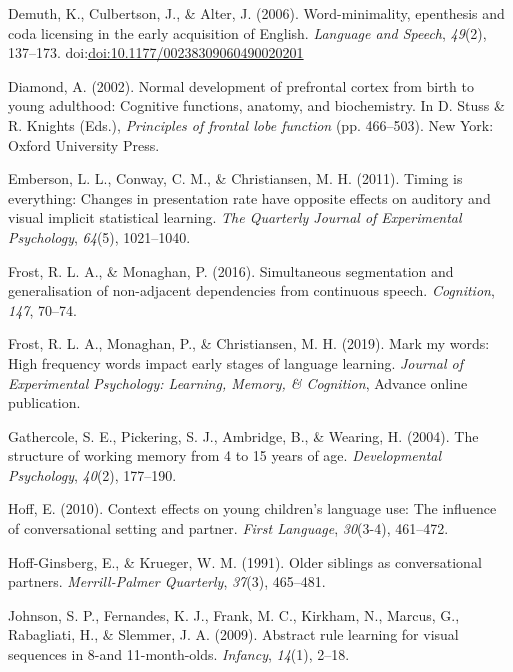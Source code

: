 \documentclass[man,mask,floatsintext]{apa6}
\begin{document}
\hypertarget{ref-demuth2006word}{}
Demuth, K., Culbertson, J., \& Alter, J. (2006). Word-minimality,
epenthesis and coda licensing in the early acquisition of English.
\emph{Language and Speech}, \emph{49}(2), 137--173.
doi:\href{https://doi.org/doi:10.1177/00238309060490020201}{doi:10.1177/00238309060490020201}

\hypertarget{ref-diamond2002normal}{}
Diamond, A. (2002). Normal development of prefrontal cortex from birth
to young adulthood: Cognitive functions, anatomy, and biochemistry. In
D. Stuss \& R. Knights (Eds.), \emph{Principles of frontal lobe
function} (pp. 466--503). New York: Oxford University Press.

\hypertarget{ref-emberson2011timing}{}
Emberson, L. L., Conway, C. M., \& Christiansen, M. H. (2011). Timing is
everything: Changes in presentation rate have opposite effects on
auditory and visual implicit statistical learning. \emph{The Quarterly
Journal of Experimental Psychology}, \emph{64}(5), 1021--1040.

\hypertarget{ref-frost2016simultaneous}{}
Frost, R. L. A., \& Monaghan, P. (2016). Simultaneous segmentation and
generalisation of non-adjacent dependencies from continuous speech.
\emph{Cognition}, \emph{147}, 70--74.

\hypertarget{ref-frost2019}{}
Frost, R. L. A., Monaghan, P., \& Christiansen, M. H. (2019). Mark my
words: High frequency words impact early stages of language learning.
\emph{Journal of Experimental Psychology: Learning, Memory, \&
Cognition}, Advance online publication.

\hypertarget{ref-gathercole2004structure}{}
Gathercole, S. E., Pickering, S. J., Ambridge, B., \& Wearing, H.
(2004). The structure of working memory from 4 to 15 years of age.
\emph{Developmental Psychology}, \emph{40}(2), 177--190.

\hypertarget{ref-hoff2010context}{}
Hoff, E. (2010). Context effects on young children's language use: The
influence of conversational setting and partner. \emph{First Language},
\emph{30}(3-4), 461--472.

\hypertarget{ref-hoff1991older}{}
Hoff-Ginsberg, E., \& Krueger, W. M. (1991). Older siblings as
conversational partners. \emph{Merrill-Palmer Quarterly}, \emph{37}(3),
465--481.

\hypertarget{ref-johnson2009abstract}{}
Johnson, S. P., Fernandes, K. J., Frank, M. C., Kirkham, N., Marcus, G.,
Rabagliati, H., \& Slemmer, J. A. (2009). Abstract rule learning for
visual sequences in 8-and 11-month-olds. \emph{Infancy}, \emph{14}(1),
2--18.
\end{document}
